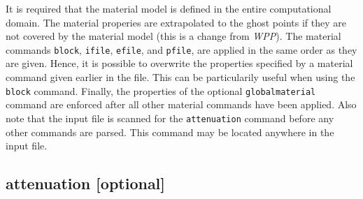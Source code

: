 \documentclass[11pt]{report}
\begin{document}
It is required that the material model is defined in the entire computational domain. The material
properies are extrapolated to the ghost points if they are not covered by the material model (this
is a change from \emph{WPP}). The material commands \verb+block+, \verb+ifile+, \verb+efile+, and
\verb+pfile+, are applied in the same order as they are given. Hence, it is possible to overwrite
the properties specified by a material command given earlier in the file. This can be particularily
useful when using the \verb+block+ command. Finally, the properties of the optional
\verb+globalmaterial+ command are enforced after all other material commands have been applied. Also
note that the input file is scanned for the \verb+attenuation+ command before any other commands are
parsed. This command may be located anywhere in the input file.

\subsection{attenuation [optional]}
\label{keyword:attenuation}
\end{document}
